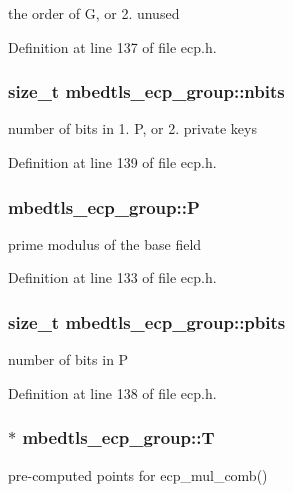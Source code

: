 \begin{DoxyEnumerate}
\item the order of G, or 2. unused 
\end{DoxyEnumerate}

Definition at line 137 of file ecp.\-h.

\hypertarget{structmbedtls__ecp__group_aee5ef1a30d9a5e34810c7a9a7120a10b}{
\subsubsection[{nbits}]{\setlength{\rightskip}{0pt plus 5cm}size\-\_\-t mbedtls\-\_\-ecp\-\_\-group\-::nbits}}\label{structmbedtls__ecp__group_aee5ef1a30d9a5e34810c7a9a7120a10b}
number of bits in 1. P, or 2. private keys 

Definition at line 139 of file ecp.\-h.

\hypertarget{structmbedtls__ecp__group_ae049e9c949bf5d30e71b4b31819f6007}{
\subsubsection[{P}]{ mbedtls\-\_\-ecp\-\_\-group\-::\-P}}\label{structmbedtls__ecp__group_ae049e9c949bf5d30e71b4b31819f6007}
prime modulus of the base field 

Definition at line 133 of file ecp.\-h.

\hypertarget{structmbedtls__ecp__group_a039ad9e51dc52e46a422e74051b2b837}{
\subsubsection[{pbits}]{\setlength{\rightskip}{0pt plus 5cm}size\-\_\-t mbedtls\-\_\-ecp\-\_\-group\-::pbits}}\label{structmbedtls__ecp__group_a039ad9e51dc52e46a422e74051b2b837}
number of bits in P 

Definition at line 138 of file ecp.\-h.

\hypertarget{structmbedtls__ecp__group_a4beb01054d800f047b5479f4e0e8d7d8}{
\subsubsection[{T}]{$\ast$ mbedtls\-\_\-ecp\-\_\-group\-::\-T}}\label{structmbedtls__ecp__group_a4beb01054d800f047b5479f4e0e8d7d8}
pre-\/computed points for ecp\-\_\-mul\-\_\-comb() 

